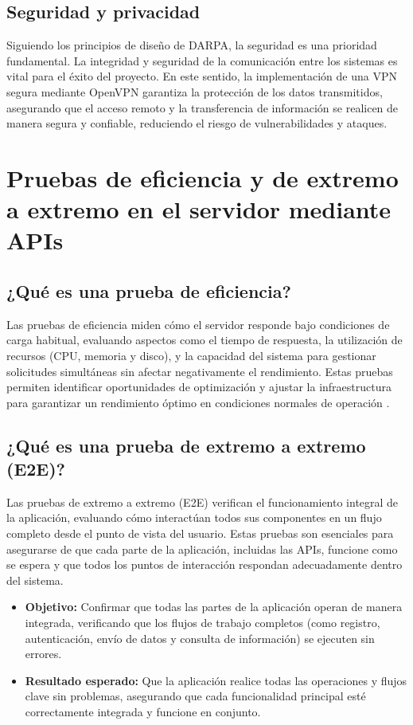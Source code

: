 \subsection{Seguridad y privacidad}
Siguiendo los principios de diseño de DARPA, la seguridad es una prioridad fundamental. La integridad y seguridad de la comunicación entre los sistemas es vital para el éxito del proyecto. En este sentido, la implementación de una VPN segura mediante OpenVPN garantiza la protección de los datos transmitidos, asegurando que el acceso remoto y la transferencia de información se realicen de manera segura y confiable, reduciendo el riesgo de vulnerabilidades y ataques.

\section{Pruebas de eficiencia y de extremo a extremo en el servidor mediante APIs}

\subsection{¿Qué es una prueba de eficiencia?}
Las pruebas de eficiencia miden cómo el servidor responde bajo condiciones de carga habitual, evaluando aspectos como el tiempo de respuesta, la utilización de recursos (CPU, memoria y disco), y la capacidad del sistema para gestionar solicitudes simultáneas sin afectar negativamente el rendimiento. Estas pruebas permiten identificar oportunidades de optimización y ajustar la infraestructura para garantizar un rendimiento óptimo en condiciones normales de operación \cite{E2ETestingOverview}.

\subsection{¿Qué es una prueba de extremo a extremo (E2E)?}
Las pruebas de extremo a extremo (E2E) verifican el funcionamiento integral de la aplicación, evaluando cómo interactúan todos sus componentes en un flujo completo desde el punto de vista del usuario. Estas pruebas son esenciales para asegurarse de que cada parte de la aplicación, incluidas las APIs, funcione como se espera y que todos los puntos de interacción respondan adecuadamente dentro del sistema.

\begin{itemize}
    \item \textbf{Objetivo:} Confirmar que todas las partes de la aplicación operan de manera integrada, verificando que los flujos de trabajo completos (como registro, autenticación, envío de datos y consulta de información) se ejecuten sin errores.
    \item \textbf{Resultado esperado:} Que la aplicación realice todas las operaciones y flujos clave sin problemas, asegurando que cada funcionalidad principal esté correctamente integrada y funcione en conjunto.
\end{itemize}

